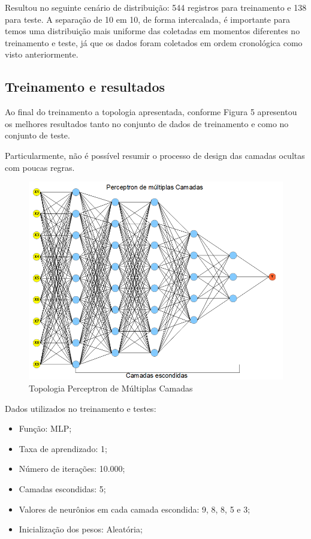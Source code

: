 \documentclass[conference]{IEEEtran}
\begin{document}
   Resultou no seguinte cenário de distribuição: 544 registros para treinamento e 138 para teste. A separação de 10 em 10, de forma intercalada, é importante para temos uma distribuição mais uniforme das coletadas em momentos diferentes no treinamento e teste, já que os dados foram coletados em ordem cronológica como visto anteriormente.
    
    
  
   \subsection{Treinamento e resultados}
    
    Ao final do treinamento a topologia apresentada, conforme Figura 5 apresentou os melhores resultados tanto no conjunto de dados de treinamento e como no conjunto de teste. 
    
    Particularmente, não é possível resumir o processo de design das camadas ocultas com poucas regras. 
    
        \begin{figure}[htbp]
	\centerline{\includegraphics[scale=0.4]{Perceptron-MLP.png}}
	\caption{Topologia Perceptron de Múltiplas Camadas}
	
	\label{fig}
	\end{figure}
    
   Dados utilizados no treinamento e testes:
    
     \begin{itemize}
    
    \item Função: MLP;
    \item Taxa de aprendizado: 1;
    \item Número de iterações: 10.000;
    \item Camadas escondidas: 5;
    \item Valores de neurônios em cada camada escondida: 9, 8, 8, 5 e 3;
    \item  Inicialização dos pesos: Aleatória;
    
    \end{itemize}
  
\end{document}

